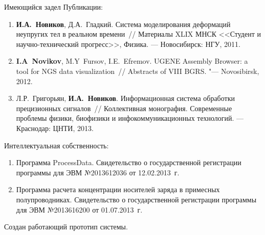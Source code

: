 \documentclass[usenames,dvipsnames,pdftex,unicode,hidelinks]{beamer}
\begin{document}
  \begin{frame}{Имеющийся задел}
    Публикации:
    {
      \scriptsize
      \begin{enumerate}
        \item
          \textbf{И.А.~Новиков}, Д.А.~Гладкий. Система моделирования деформаций неупругих тел в реальном времени~//
          Материалы XLIX МНСК <<Студент и научно-технический прогресс>>, Физика. --- Новосибирск:
          НГУ, 2011.
        \item
          \textbf{I.A~Novikov}, M.Y~Fursov, I.E.~Efremov. UGENE Assembly Browser: a tool for NGS data
          visualization~// Abstracts of VIII BGRS. "--- Novosibirsk, 2012.
        \item
          Л.Р.~Григорьян, \textbf{И.А.~Новиков}. Информационная система обработки прецизионных сигналов~//
          Коллективная монография. Современные проблемы физики, биофизики и инфокоммуникационных технологий.
          --- Краснодар: ЦНТИ, 2013.
      \end{enumerate}
    }
    Интеллектуальная собственность:
    {
      \scriptsize
      \begin{enumerate}
        \item
          Программа ProcessData. Свидетельство о государственной регистрации программы
          для ЭВМ №2013612036 от 12.02.2013~г.
        \item
          Программа расчета концентрации носителей заряда в примесных полупроводниках.
          Свидетельство о государственной регистрации программы для ЭВМ №2013616200 от 01.07.2013~г.
      \end{enumerate}
    }
    Создан работающий прототип системы.
  \end{frame}
\end{document}
